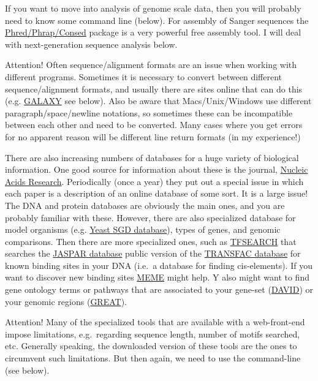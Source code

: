\documentclass[]{article}
\begin{document}
If you want to move into analysis of genome scale data, then you will
probably need to know some command line (below). For assembly of Sanger
sequences the
\href{http://www.phrap.org/phredphrapconsed.html}{Phred/Phrap/Consed}
package is a very powerful free assembly tool. I will deal with
next-generation sequence analysis below.

Attention! Often sequence/alignment formats are an issue when working
with different programs. Sometimes it is necessary to convert between
different sequence/alignment formats, and usually there are sites online
that can do this (e.g. \href{https://usegalaxy.org/}{GALAXY} see below).
Also be aware that Macs/Unix/Windows use different
paragraph/space/newline notations, so sometimes these can be
incompatible between each other and need to be converted. Many cases
where you get errors for no apparent reason will be different line
return formats (in my experience!)

There are also increasing numbers of databases for a huge variety of
biological information. One good source for information about these is
the journal, \href{http://nar.oxfordjournals.org/}{Nucleic Acids
Research}. Periodically (once a year) they put out a special issue in
which each paper is a description of an online database of some sort. It
is a large issue! The DNA and protein databases are obviously the main
ones, and you are probably familiar with these. However, there are also
specialized database for model organisms (e.g.
\href{http://www.yeastgenome.org/}{Yeast SGD database}), types of genes,
and genomic comparisons. Then there are more specialized ones, such as
\href{http://www.cbrc.jp/research/db/TFSEARCH.html}{TFSEARCH} that
searches the \href{http://jaspar.genereg.net/}{JASPAR database} public
version of the
\href{http://www.gene-regulation.com/pub/databases.html}{TRANSFAC
database} for known binding sites in your DNA (i.e.~a database for
finding cis-elements). If you want to discover new binding sites
\href{http://meme.nbcr.net/meme/}{MEME} might help. Y also might want to
find gene ontology terms or pathways that are associated to your
gene-set (\href{http://david.abcc.ncifcrf.gov/}{DAVID}) or your genomic
regions (\href{http://bejerano.stanford.edu/great/public/html/}{GREAT}).

Attention! Many of the specialized tools that are available with a
web-front-end impose limitations, e.g.~regarding sequence length, number
of motifs searched, etc. Generally speaking, the downloaded version of
these tools are the ones to circumvent such limitations. But then again,
we need to use the command-line (see below).
\end{document}
